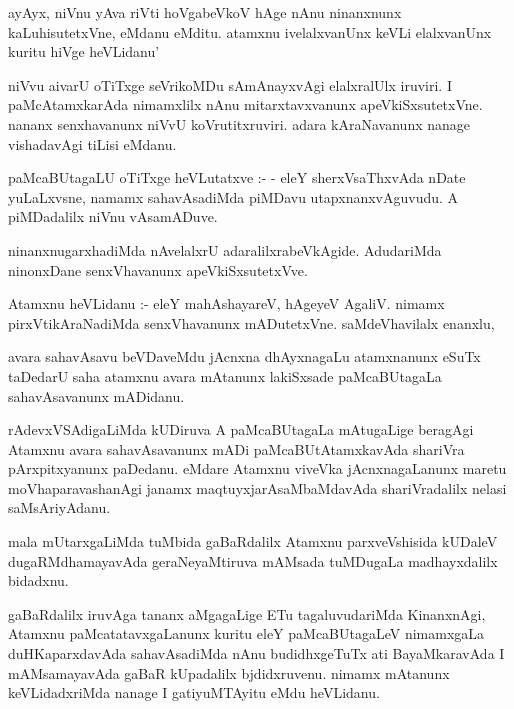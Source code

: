 \documentclass{article}
\begin{document}
\begin{mn}
ayAyx, niVnu yAva riVti hoVgabeVkoV hAge nAnu ninanxnunx kaLuhisutetxVne,
 eMdanu eMditu.  atamxnu  ivelalxvanUnx keVLi elalxvanUnx kuritu hiVge heVLidanu'
\end{mn}

\begin{mn}
niVvu aivarU oTiTxge seVrikoMDu sAmAnayxvAgi elalxralUlx iruviri.
 I paMcAtamxkarAda nimamxlilx nAnu mitarxtavxvanunx apeVkiSxsutetxVne.
 nananx senxhavanunx niVvU koVrutitxruviri.  adara kAraNavanunx nanage
 vishadavAgi tiLisi eMdanu.
\end{mn}

\begin{mn}
paMcaBUtagaLU oTiTxge heVLutatxve :- - eleY sherxVsaThxvAda nDate yuLaLxvsne, 
namamx sahavAsadiMda piMDavu utapxnanxvAguvudu. A piMDadalilx niVnu vAsamADuve.
\end{mn}

\begin{mn}
ninanxnugarxhadiMda nAvelalxrU adaralilxrabeVkAgide.  AdudariMda ninonxDane
senxVhavanunx apeVkiSxsutetxVve.
\end{mn}

\begin{mn}
Atamxnu heVLidanu :- eleY mahAshayareV, hAgeyeV AgaliV. nimamx pirxVtikAraNadiMda 
senxVhavanunx mADutetxVne.  saMdeVhavilalx enanxlu,
\end{mn}

\begin{mn}
avara sahavAsavu beVDaveMdu jAcnxna dhAyxnagaLu atamxnanunx eSuTx taDedarU 
saha atamxnu avara mAtanunx lakiSxsade paMcaBUtagaLa sahavAsavanunx mADidanu.
\end{mn}

\begin{mn}
rAdevxVSAdigaLiMda kUDiruva A paMcaBUtagaLa mAtugaLige beragAgi Atamxnu
avara sahavAsavanunx mADi paMcaBUtAtamxkavAda shariVra pArxpitxyanunx paDedanu. 
eMdare Atamxnu  viveVka jAcnxnagaLanunx maretu moVhaparavashanAgi janamx
maqtuyxjarAsaMbaMdavAda shariVradalilx nelasi saMsAriyAdanu.
\end{mn}

\begin{mn}
mala mUtarxgaLiMda tuMbida gaBaRdalilx Atamxnu parxveVshisida kUDaleV
dugaRMdhamayavAda geraNeyaMtiruva mAMsada tuMDugaLa madhayxdalilx bidadxnu. 
\end{mn}

\begin{mn}
gaBaRdalilx iruvAga tananx aMgagaLige ETu tagaluvudariMda KinanxnAgi, Atamxnu
paMcatatavxgaLanunx kuritu eleY paMcaBUtagaLeV nimamxgaLa duHKaparxdavAda 
sahavAsadiMda nAnu  budidhxgeTuTx ati BayaMkaravAda I mAMsamayavAda gaBaR
kUpadalilx bjdidxruvenu.  nimamx mAtanunx keVLidadxriMda nanage 
I gatiyuMTAyitu eMdu  heVLidanu.
\end{mn}
\end{document}
